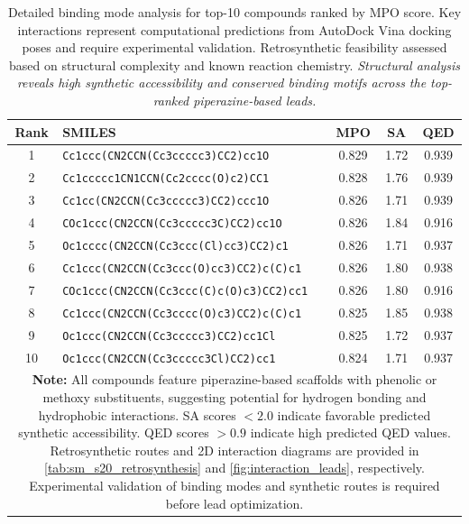 \documentclass[journal=jcisd8,manuscript=suppinfo]{achemso}
\begin{document}
\begin{table}[!htbp]
\centering
\caption{Detailed binding mode analysis for top-10 compounds ranked by MPO score. Key interactions represent computational predictions from AutoDock Vina docking poses and require experimental validation. Retrosynthetic feasibility assessed based on structural complexity and known reaction chemistry. \textit{Structural analysis reveals high synthetic accessibility and conserved binding motifs across the top-ranked piperazine-based leads.}}
\label{tab:top10_binding}
\begin{tabular}{@{}c p{8cm} c c c@{}}
\toprule
\textbf{Rank} & \textbf{SMILES} & \textbf{MPO} & \textbf{SA} & \textbf{QED} \\
\midrule
1 & \texttt{Cc1ccc(CN2CCN(Cc3ccccc3)CC2)cc1O} & \num{0.829} & \num{1.72} & \num{0.939} \\
2 & \texttt{Cc1ccccc1CN1CCN(Cc2cccc(O)c2)CC1} & \num{0.828} & \num{1.76} & \num{0.939} \\
3 & \texttt{Cc1cc(CN2CCN(Cc3ccccc3)CC2)ccc1O} & \num{0.826} & \num{1.71} & \num{0.939} \\
4 & \texttt{COc1ccc(CN2CCN(Cc3ccccc3C)CC2)cc1O} & \num{0.826} & \num{1.84} & \num{0.916} \\
5 & \texttt{Oc1cccc(CN2CCN(Cc3ccc(Cl)cc3)CC2)c1} & \num{0.826} & \num{1.71} & \num{0.937} \\
6 & \texttt{Cc1ccc(CN2CCN(Cc3ccc(O)cc3)CC2)c(C)c1} & \num{0.826} & \num{1.80} & \num{0.938} \\
7 & \texttt{COc1ccc(CN2CCN(Cc3ccc(C)c(O)c3)CC2)cc1} & \num{0.826} & \num{1.80} & \num{0.916} \\
8 & \texttt{Cc1ccc(CN2CCN(Cc3cccc(O)c3)CC2)c(C)c1} & \num{0.825} & \num{1.85} & \num{0.938} \\
9 & \texttt{Oc1ccc(CN2CCN(Cc3ccccc3)CC2)cc1Cl} & \num{0.825} & \num{1.72} & \num{0.937} \\
10 & \texttt{Oc1ccc(CN2CCN(Cc3ccccc3Cl)CC2)cc1} & \num{0.824} & \num{1.71} & \num{0.937} \\
\bottomrule
\multicolumn{5}{p{16cm}}{
\noindent\textbf{Note:} All compounds feature piperazine-based scaffolds with phenolic or methoxy substituents, suggesting potential for hydrogen bonding and
hydrophobic interactions. SA scores $< \num{2.0}$ indicate favorable predicted synthetic accessibility. QED scores $> \num{0.9}$ indicate high predicted QED values.
Retrosynthetic routes and 2D interaction diagrams are provided in \cref{tab:sm_s20_retrosynthesis} and \cref{fig:interaction_leads}, respectively. Experimental
validation of binding modes and synthetic routes is required before lead optimization.
}
\end{tabular}
\end{table}
\end{document}
